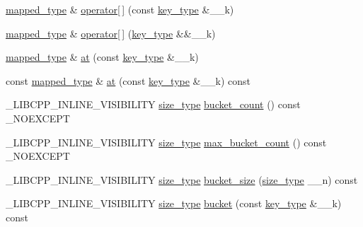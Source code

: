 \begin{DoxyCompactItemize}
\item 
\hyperlink{class__map_a652392c4150010664c8b1b76e460ae0a}{mapped\+\_\+type} \& \hyperlink{class__map_aed4646b7fd717abba9799a259c365955}{operator\mbox{[}$\,$\mbox{]}} (const \hyperlink{class__map_a38e77c21e3aba60e817666c55ff61164}{key\+\_\+type} \&\+\_\+\+\_\+k)
\item 
\hyperlink{class__map_a652392c4150010664c8b1b76e460ae0a}{mapped\+\_\+type} \& \hyperlink{class__map_ac01b7a74fdb0a517bda1189296e9902b}{operator\mbox{[}$\,$\mbox{]}} (\hyperlink{class__map_a38e77c21e3aba60e817666c55ff61164}{key\+\_\+type} \&\&\+\_\+\+\_\+k)
\item 
\hyperlink{class__map_a652392c4150010664c8b1b76e460ae0a}{mapped\+\_\+type} \& \hyperlink{class__map_a858e9e66724b2ad01f7a9453e9a04cc7}{at} (const \hyperlink{class__map_a38e77c21e3aba60e817666c55ff61164}{key\+\_\+type} \&\+\_\+\+\_\+k)
\item 
const \hyperlink{class__map_a652392c4150010664c8b1b76e460ae0a}{mapped\+\_\+type} \& \hyperlink{class__map_afa118d6dbdd316695524df17dd37d837}{at} (const \hyperlink{class__map_a38e77c21e3aba60e817666c55ff61164}{key\+\_\+type} \&\+\_\+\+\_\+k) const 
\item 
\+\_\+\+L\+I\+B\+C\+P\+P\+\_\+\+I\+N\+L\+I\+N\+E\+\_\+\+V\+I\+S\+I\+B\+I\+L\+I\+T\+Y \hyperlink{class__map_adc37f621be25fda072b12873e60e9fc7}{size\+\_\+type} \hyperlink{class__map_af3d04cb16f1d8ea480fdba1b8d3160f8}{bucket\+\_\+count} () const \+\_\+\+N\+O\+E\+X\+C\+E\+P\+T
\item 
\+\_\+\+L\+I\+B\+C\+P\+P\+\_\+\+I\+N\+L\+I\+N\+E\+\_\+\+V\+I\+S\+I\+B\+I\+L\+I\+T\+Y \hyperlink{class__map_adc37f621be25fda072b12873e60e9fc7}{size\+\_\+type} \hyperlink{class__map_a665391de613aa97f8119780fec563794}{max\+\_\+bucket\+\_\+count} () const \+\_\+\+N\+O\+E\+X\+C\+E\+P\+T
\item 
\+\_\+\+L\+I\+B\+C\+P\+P\+\_\+\+I\+N\+L\+I\+N\+E\+\_\+\+V\+I\+S\+I\+B\+I\+L\+I\+T\+Y \hyperlink{class__map_adc37f621be25fda072b12873e60e9fc7}{size\+\_\+type} \hyperlink{class__map_a4f234450a2cc78fab2d942911d1d04b2}{bucket\+\_\+size} (\hyperlink{class__map_adc37f621be25fda072b12873e60e9fc7}{size\+\_\+type} \+\_\+\+\_\+n) const 
\item 
\+\_\+\+L\+I\+B\+C\+P\+P\+\_\+\+I\+N\+L\+I\+N\+E\+\_\+\+V\+I\+S\+I\+B\+I\+L\+I\+T\+Y \hyperlink{class__map_adc37f621be25fda072b12873e60e9fc7}{size\+\_\+type} \hyperlink{class__map_a11e2ab29b4d48984b5e74d7671258870}{bucket} (const \hyperlink{class__map_a38e77c21e3aba60e817666c55ff61164}{key\+\_\+type} \&\+\_\+\+\_\+k) const 
\item 

\end{DoxyCompactItemize}
